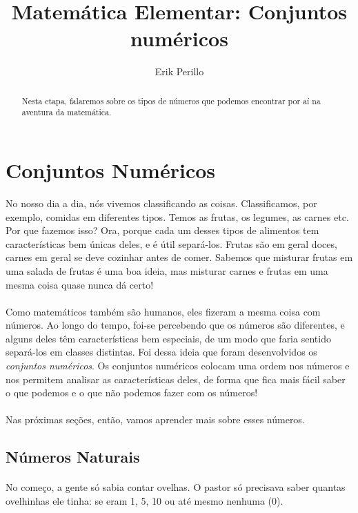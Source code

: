 \documentclass[11pt]{article}
\begin{document}
\title{Matemática Elementar: Conjuntos numéricos}
\author{Erik Perillo}
\date{}
\maketitle
\begin{abstract}
Nesta etapa, falaremos sobre os tipos de números que podemos encontrar por aí
na aventura da matemática.
\end{abstract}

\newpage

\tableofcontents

\newpage

\section{Conjuntos Numéricos}
No nosso dia a dia, nós vivemos classificando as coisas. Classificamos, por
exemplo, comidas em diferentes tipos. Temos as frutas, os legumes, as carnes 
etc. Por que fazemos isso? Ora, porque cada um desses tipos de alimentos tem
características bem únicas deles, e é útil separá-los. 
Frutas são em geral doces, carnes em geral se deve cozinhar antes de comer. 
Sabemos que misturar frutas em uma salada de frutas é uma boa ideia, mas 
misturar carnes e frutas em uma mesma coisa quase nunca dá certo!
\paragraph{}
Como matemáticos também são humanos, eles fizeram a mesma coisa com números.
Ao longo do tempo, foi-se percebendo que os números são diferentes, e alguns
deles têm características bem especiais, de um modo que faria sentido separá-los
em classes distintas. Foi dessa ideia que foram desenvolvidos os
\textit{conjuntos numéricos}. Os conjuntos numéricos colocam uma ordem nos 
números e nos permitem analisar as características deles, de forma que fica
mais fácil saber o que podemos e o que não podemos fazer com os números!
\paragraph{}
Nas próximas seções, então, vamos aprender mais sobre esses números.

\subsection{Números Naturais}
\paragraph{}
No começo, a gente só sabia contar ovelhas. O pastor só precisava saber quantas
ovelhinhas ele tinha: se eram 1, 5, 10 ou até mesmo nenhuma (0). 
\end{document}
